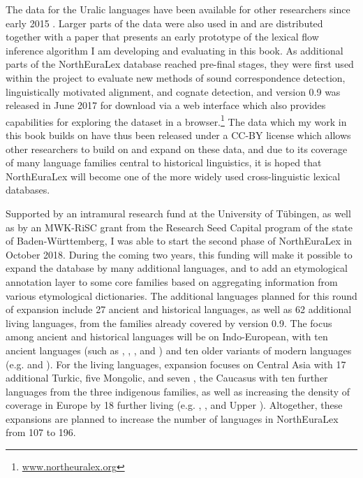 The data for the Uralic languages have been available for other researchers since early 2015 \citep{dellert2015a}. Larger parts of the data were also used in and are distributed together with a paper \citep{dellert2016a} that presents an early prototype of the lexical flow inference algorithm I am developing and evaluating in this book. As additional parts of the NorthEuraLex database reached pre-final stages, they were first used within the project to evaluate new methods of sound correspondence detection, linguistically motivated alignment, and cognate detection, and version 0.9 was released in June 2017 for download via a web interface which also provides capabilities for exploring the dataset in a browser.\footnote{\url{www.northeuralex.org}} The data which my work in this book builds on have thus been released under a CC-BY license which allows other researchers to build on and expand on these data, and due to its coverage of many language families central to historical linguistics, it is hoped that NorthEuraLex will become one of the more widely used cross-linguistic lexical databases.

Supported by an intramural research fund at the University of Tübingen, as well as by an MWK-RiSC grant from the Research Seed Capital program of the state of Baden-Württemberg, I was able to start the second phase of NorthEura\-Lex in October 2018. During the coming two years, this funding will make it possible to expand the database by many additional languages, and to add an etymological annotation layer to some core families based on aggregating information from various etymological dictionaries. The additional languages planned for this round of expansion include 27 ancient and historical languages, as well as 62 additional living languages, from the families already covered by version 0.9. The focus among ancient and historical languages will be on Indo-European, with ten ancient languages (such as , , , and ) and ten older variants of modern languages (e.g.  and ). For the living languages, expansion focuses on Central Asia with 17 additional Turkic, five Mongolic, and seven , the Caucasus with ten further languages from the three indigenous families, as well as increasing the density of coverage in Europe by 18 further living  (e.g. , , and Upper ). Altogether, these expansions are planned to increase the number of languages in NorthEuraLex from 107 to 196.

